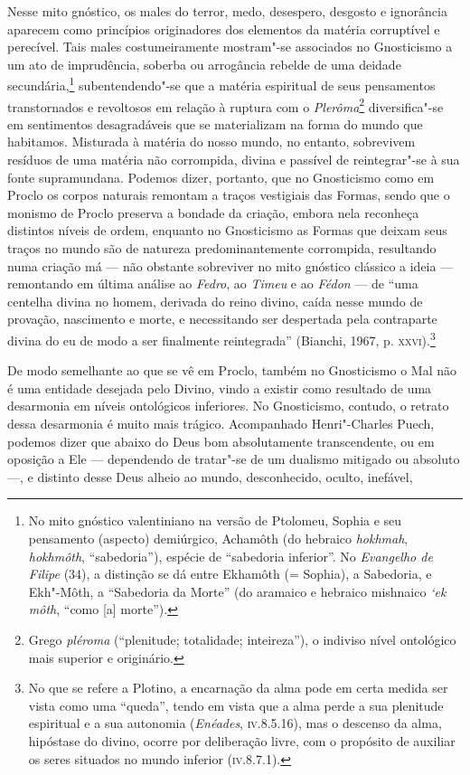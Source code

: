 Nesse mito gnóstico, os males do terror, medo, desespero,
desgosto e ignorância aparecem como princípios originadores dos
elementos da matéria corruptível e perecível. Tais males
costumeiramente mostram"-se associados no Gnosticismo a um ato de
imprudência, soberba ou arrogância rebelde de uma deidade
secundária,\footnote{ No mito gnóstico valentiniano na versão de
Ptolomeu, Sophia e seu pensamento (aspecto) demiúrgico, Achamôth
(do hebraico \emph{hokhmah}, \emph{hokhmôth}, “sabedoria”),
espécie de “sabedoria inferior”. No \emph{Evangelho de Filipe}
(34), a distinção se dá entre Ekhamôth (= Sophia), a Sabedoria,
e Ekh"-Môth, a “Sabedoria da Morte” (do aramaico e hebraico
mishnaico \emph{‘ek môth}, “como [a] morte”).}
subentendendo"-se que a matéria espiritual de seus pensamentos
transtornados e revoltosos em relação à ruptura com o
\emph{Plerôma}\footnote{ Grego
\emph{pl}\emph{é}\emph{r}\emph{o}\emph{ma}
(“plenitude; totalidade; inteireza”), o indiviso nível
ontológico mais superior e originário.} diversifica"-se em
sentimentos desagradáveis que se materializam na forma do mundo
que habitamos. Misturada à matéria do nosso mundo, no entanto,
sobrevivem resíduos de uma matéria não corrompida, divina e
passível de reintegrar"-se à sua fonte supramundana. Podemos
dizer, portanto, que no Gnosticismo como em Proclo os corpos
naturais remontam a traços vestigiais das Formas, sendo que o
monismo de Proclo preserva a bondade da criação, embora nela
reconheça distintos níveis de ordem, enquanto no Gnosticismo as
Formas que deixam seus traços no mundo são de natureza
predominantemente corrompida, resultando numa criação má --- não
obstante sobreviver no mito gnóstico clássico a ideia ---
remontando em última análise ao \emph{Fedro}, ao
\emph{Timeu} e ao \emph{Fédon} --- de “uma centelha divina no
homem, derivada do reino divino, caída nesse mundo de provação,
nascimento e morte, e necessitando ser despertada pela
contraparte divina do eu de modo a ser finalmente reintegrada”
(Bianchi, 1967, p. \textsc{xxvi}).\footnote{ No que se refere a Plotino, a
encarnação da alma pode em certa medida ser vista como uma
“queda”, tendo em vista que a alma perde a sua plenitude
espiritual e a sua autonomia (\emph{Enéades}, \textsc{iv}.8.5.16), mas
o descenso da alma, hipóstase do divino, ocorre  por deliberação
livre, com o propósito de auxiliar os seres situados no mundo
inferior (\textsc{iv}.8.7.1).} 

 De modo semelhante ao que se vê em Proclo, também no
Gnosticismo o Mal não é uma entidade desejada pelo Divino, vindo
a existir como resultado de uma desarmonia em níveis ontológicos
inferiores. No Gnosticismo, contudo, o retrato dessa desarmonia
é muito mais trágico. Acompanhado Henri"-Charles Puech, podemos
dizer que abaixo do Deus bom absolutamente transcendente, ou em
oposição a Ele --- dependendo de tratar"-se de um dualismo mitigado
ou absoluto ---, e distinto desse Deus alheio ao mundo,
desconhecido, oculto, inefável, 

